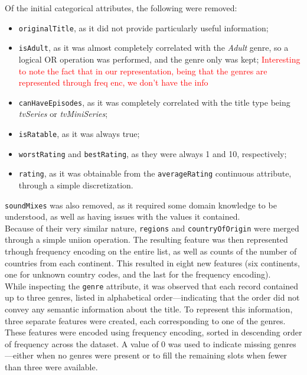 Of the initial categorical attributes, the following were removed:
\begin{itemize}
    \item \texttt{originalTitle}, as it did not provide particularly useful
    information;
    \item \texttt{isAdult}, as it was almost completely correlated with the
    \textit{Adult} genre, so a logical OR operation was performed, and the genre
    only was kept;
    \textcolor{red}{Interesting to note the fact that in our representation, being that
        the genres are represented through freq enc, we don't have the info}
    \item \texttt{canHaveEpisodes}, as it was completely correlated with the title type
    being \textit{tvSeries} or \textit{tvMiniSeries};
    \item \texttt{isRatable}, as it was always true;
    \item \texttt{worstRating} and \texttt{bestRating}, as they were always
    1 and 10, respectively;
    \item \texttt{rating}, as it was obtainable from the \texttt{averageRating}
    continuous attribute, through a simple discretization.
\end{itemize}

\texttt{soundMixes} was also removed, as it required some domain knowledge to be
understood, as well as having issues with the values it contained.\\
Because of their very similar nature, \texttt{regions} and \texttt{countryOfOrigin}
were merged through a simple uniion operation. The resulting feature was then
represented trhough frequency encoding on the entire list, as well as
counts of the number of countries from each continent.
This resulted in eight new features (six continents, one for unknown country codes,
and the last for the frequency encoding).\\
While inspecting the \texttt{genre} attribute, it was observed that each record
contained up to three genres, listed in alphabetical order—indicating that the order
did not convey any semantic information about the title.  
To represent this information, three separate features were created, each
corresponding to one of the genres. These features were encoded using frequency
encoding, sorted in descending order of frequency across the dataset.  
A value of 0 was used to indicate missing genres—either when no genres were present or
to fill the remaining slots when fewer than three were available.\\


